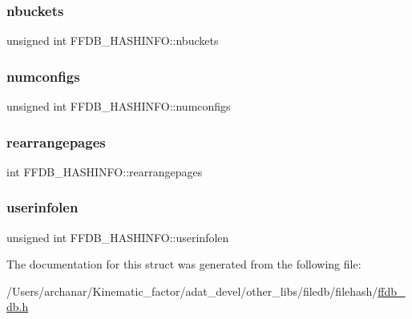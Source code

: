 \subsubsection{\texorpdfstring{nbuckets}{nbuckets}}
{\footnotesize\ttfamily unsigned int F\+F\+D\+B\+\_\+\+H\+A\+S\+H\+I\+N\+F\+O\+::nbuckets}

\mbox{\label{structFFDB__HASHINFO_a6f03a772f4e63a8b7bed61705406f9b7}} 
\subsubsection{\texorpdfstring{numconfigs}{numconfigs}}
{\footnotesize\ttfamily unsigned int F\+F\+D\+B\+\_\+\+H\+A\+S\+H\+I\+N\+F\+O\+::numconfigs}

\mbox{\label{structFFDB__HASHINFO_a2399ac211531c76b33d9e34ed60a86c9}} 
\subsubsection{\texorpdfstring{rearrangepages}{rearrangepages}}
{\footnotesize\ttfamily int F\+F\+D\+B\+\_\+\+H\+A\+S\+H\+I\+N\+F\+O\+::rearrangepages}

\mbox{\label{structFFDB__HASHINFO_ab4185e8dc1347babf4e17733755073de}} 
\subsubsection{\texorpdfstring{userinfolen}{userinfolen}}
{\footnotesize\ttfamily unsigned int F\+F\+D\+B\+\_\+\+H\+A\+S\+H\+I\+N\+F\+O\+::userinfolen}



The documentation for this struct was generated from the following file\+:\begin{DoxyCompactItemize}
\item 
/\+Users/archanar/\+Kinematic\+\_\+factor/adat\+\_\+devel/other\+\_\+libs/filedb/filehash/\mbox{\hyperlink{other__libs_2filedb_2filehash_2ffdb__db_8h}{ffdb\+\_\+db.\+h}}\end{DoxyCompactItemize}
